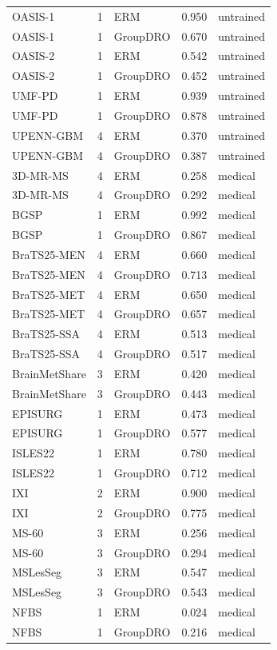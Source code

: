 \begin{tabular}{lrlrl}
OASIS-1 & 1 & ERM & 0.950 & untrained \\
OASIS-1 & 1 & GroupDRO & 0.670 & untrained \\
OASIS-2 & 1 & ERM & 0.542 & untrained \\
OASIS-2 & 1 & GroupDRO & 0.452 & untrained \\
UMF-PD & 1 & ERM & 0.939 & untrained \\
UMF-PD & 1 & GroupDRO & 0.878 & untrained \\
UPENN-GBM & 4 & ERM & 0.370 & untrained \\
UPENN-GBM & 4 & GroupDRO & 0.387 & untrained \\
3D-MR-MS & 4 & ERM & 0.258 & medical \\
3D-MR-MS & 4 & GroupDRO & 0.292 & medical \\
BGSP & 1 & ERM & 0.992 & medical \\
BGSP & 1 & GroupDRO & 0.867 & medical \\
BraTS25-MEN & 4 & ERM & 0.660 & medical \\
BraTS25-MEN & 4 & GroupDRO & 0.713 & medical \\
BraTS25-MET & 4 & ERM & 0.650 & medical \\
BraTS25-MET & 4 & GroupDRO & 0.657 & medical \\
BraTS25-SSA & 4 & ERM & 0.513 & medical \\
BraTS25-SSA & 4 & GroupDRO & 0.517 & medical \\
BrainMetShare & 3 & ERM & 0.420 & medical \\
BrainMetShare & 3 & GroupDRO & 0.443 & medical \\
EPISURG & 1 & ERM & 0.473 & medical \\
EPISURG & 1 & GroupDRO & 0.577 & medical \\
ISLES22 & 1 & ERM & 0.780 & medical \\
ISLES22 & 1 & GroupDRO & 0.712 & medical \\
IXI & 2 & ERM & 0.900 & medical \\
IXI & 2 & GroupDRO & 0.775 & medical \\
MS-60 & 3 & ERM & 0.256 & medical \\
MS-60 & 3 & GroupDRO & 0.294 & medical \\
MSLesSeg & 3 & ERM & 0.547 & medical \\
MSLesSeg & 3 & GroupDRO & 0.543 & medical \\
NFBS & 1 & ERM & 0.024 & medical \\
NFBS & 1 & GroupDRO & 0.216 & medical \\

\end{tabular}

